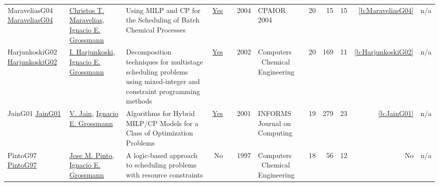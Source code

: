 {\begin{longtable}{>{\raggedright\arraybackslash}p{3cm}>{\raggedright\arraybackslash}p{6cm}>{\raggedright\arraybackslash}p{6.5cm}rrrp{2.5cm}rrrrr}
MaraveliasG04 \href{https://doi.org/10.1007/978-3-540-24664-0_1}{MaraveliasG04} & \hyperref[auth:a384]{Christos T. Maravelias}, \hyperref[auth:a385]{Ignacio E. Grossmann} & Using {MILP} and {CP} for the Scheduling of Batch Chemical Processes & \href{../works/MaraveliasG04.pdf}{Yes} & \cite{MaraveliasG04} & 2004 & CPAIOR 2004 & 20 & 15 & 15 & \ref{b:MaraveliasG04} & n/a\\
HarjunkoskiG02 \href{http://dx.doi.org/10.1016/s0098-1354(02)00100-x}{HarjunkoskiG02} & \hyperref[auth:a878]{I. Harjunkoski}, \hyperref[auth:a385]{Ignacio E. Grossmann} & Decomposition techniques for multistage scheduling problems using mixed-integer and constraint programming methods & \href{../works/HarjunkoskiG02.pdf}{Yes} & \cite{HarjunkoskiG02} & 2002 & Computers \  Chemical Engineering & 20 & 169 & 11 & \ref{b:HarjunkoskiG02} & n/a\\
JainG01 \href{http://dx.doi.org/10.1287/ijoc.13.4.258.9733}{JainG01} & \hyperref[auth:a851]{V. Jain}, \hyperref[auth:a385]{Ignacio E. Grossmann} & Algorithms for Hybrid MILP/CP Models for a Class of Optimization Problems & \href{../works/JainG01.pdf}{Yes} & \cite{JainG01} & 2001 & INFORMS Journal on Computing & 19 & 279 & 23 & \ref{b:JainG01} & n/a\\
PintoG97 \href{https://www.sciencedirect.com/science/article/pii/S0098135496003183}{PintoG97} & \hyperref[auth:a1277]{Jose M. Pinto}, \hyperref[auth:a385]{Ignacio E. Grossmann} & A logic-based approach to scheduling problems with resource constraints & No & \cite{PintoG97} & 1997 & Computers \  Chemical Engineering & 18 & 56 & 12 & No & n/a\\
\end{longtable}
}

\clearpage
